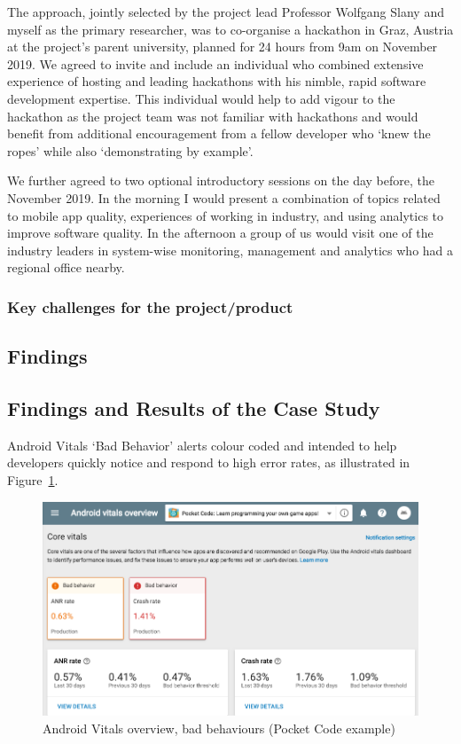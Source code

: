 The approach, jointly selected by the project lead Professor Wolfgang Slany
and myself as the primary researcher,
was to co-organise a hackathon in Graz, Austria at the project's parent university, planned for 24 hours from 9am on  November 2019. We agreed to invite and include an individual who combined extensive experience of hosting and leading hackathons with his nimble, rapid software development expertise. This individual would help to add vigour to the hackathon as the project team was not familiar with hackathons and would benefit from additional encouragement from a fellow developer who `knew the ropes' while also `demonstrating by example'.

We further agreed to two optional introductory sessions on the day before, the~ November 2019. In the morning I would present a combination of topics related to mobile app quality, experiences of working in industry, and using analytics to improve software quality. In the afternoon a group of us would visit one of the industry leaders in system-wise monitoring, management and analytics who had a regional office nearby.

\subsubsection{Key challenges for the project/product}

\subsection{Findings}
\subsection{Findings and Results of the Case Study}
\label{catrobat-case-study-findings-and-results}

Android Vitals `Bad Behavior' alerts colour coded and intended to help developers quickly notice and respond to high error rates, as illustrated in Figure~\ref{fig:android-vitals-pocketcode-alerts-23-jan-2020}. %

\begin{figure}
    \centering
    \includegraphics[width=12cm]{images/google-play-console/android-vitals-pocketcode-alerts-23-jan-2020.png}
    \caption{Android Vitals overview, bad behaviours (Pocket Code example)}
    \label{fig:android-vitals-pocketcode-alerts-23-jan-2020}
\end{figure}


